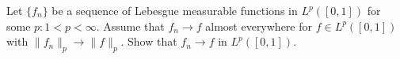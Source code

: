 Let $\{f_n\}$ be a sequence of Lebesgue measurable functions in
$L^p([0,1])$ for some $p:1<p<\infty$. Assume that $f_n\rightarrow f$
almost everywhere  for $f\in L^p([0,1])$ with
$\|f_n\|_p\rightarrow \|f\|_p$. Show that $f_n\rightarrow f$ in
$L^p([0,1])$.

